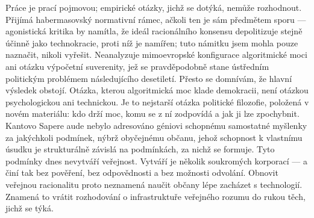 Práce je prací pojmovou; empirické otázky, jichž se dotýká, nemůže rozhodnout.
Přijímá habermasovský normativní rámec, ačkoli ten je sám předmětem sporu — agonistická kritika \parencite{Mouffe13} by namítla, že ideál racionálního konsensu depolitizuje stejně účinně jako technokracie, proti níž je namířen;
tuto námitku jsem mohla pouze naznačit, nikoli vyřešit.
Neanalyzuje mimoevropské konfigurace algoritmické moci ani otázku výpočetní suverenity, jež se pravděpodobně stane ústředním politickým problémem následujícího desetiletí.
Přesto se domnívám, že hlavní výsledek obstojí. Otázka, kterou algoritmická moc klade demokracii, není otázkou psychologickou ani technickou.
Je to nejstarší otázka politické filozofie, položená v novém materiálu: kdo drží moc, komu se z ní zodpovídá a jak ji lze zpochybnit.
Kantovo Sapere aude nebylo adresováno géniovi schopnému samostatné myšlenky za jakýchkoli podmínek, nýbrž obyčejnému občanu, jehož schopnost k vlastnímu úsudku je strukturálně závislá na podmínkách, za nichž se formuje.
Tyto podmínky dnes nevytváří veřejnost. Vytváří je několik soukromých korporací — a činí tak bez pověření, bez odpovědnosti a bez možnosti odvolání.
Obnovit veřejnou racionalitu proto neznamená naučit občany lépe zacházet s technologií.
Znamená to vrátit rozhodování o infrastruktuře veřejného rozumu do rukou těch, jichž se týká.
